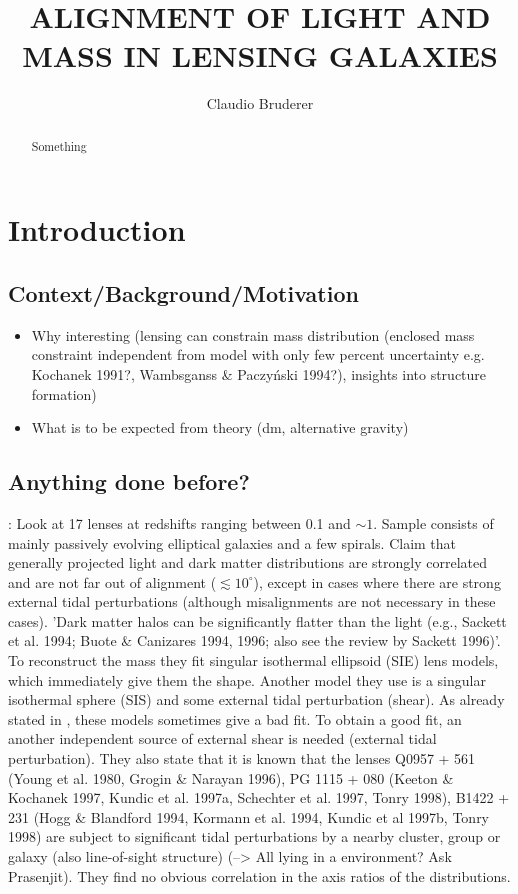 \documentclass[10pt]{article}
\title{ALIGNMENT OF LIGHT AND MASS IN LENSING GALAXIES}
\author{Claudio Bruderer}
\begin{document}
\maketitle


\begin{abstract}
\noindent Something
\end{abstract}





\section{Introduction}

\subsection{Context/Background/Motivation}
\begin{itemize}
\item Why interesting (lensing can constrain mass distribution (enclosed mass constraint independent from model with only few percent uncertainty e.g. Kochanek 1991?, Wambsganss \& Paczyński 1994?), insights into structure formation)
\item What is to be expected from theory (dm, alternative gravity)
\end{itemize}


\subsection{Anything done before?}
\textbf{\cite{1997ApJ...482..604K}}: Look at 17 lenses at redshifts ranging between 0.1 and $\sim1$. Sample consists of mainly passively evolving elliptical galaxies and a few spirals. Claim that generally projected light and dark matter distributions are strongly correlated and are not far out of alignment ($\lesssim10^{\circ}$), except in cases where there are strong external tidal perturbations (although misalignments are not necessary in these cases). 'Dark matter halos can be significantly flatter than the light (e.g., Sackett et al. 1994; Buote \& Canizares 1994, 1996; also see the review by Sackett 1996)'. To reconstruct the mass they fit singular isothermal ellipsoid (SIE) lens models, which immediately give them the shape. Another model they use is a singular isothermal sphere (SIS) and some external tidal perturbation (shear). As already stated in \cite{1998ApJ...509..561K}, these models sometimes give a bad fit. To obtain a good fit, an another independent source of external shear is needed (external tidal perturbation). They also state that it is known that the lenses Q0957 + 561 (Young et al. 1980, Grogin \& Narayan 1996), PG 1115 + 080 (Keeton \& Kochanek 1997, Kundic et al. 1997a, Schechter et al. 1997, Tonry 1998), B1422 + 231 (Hogg \& Blandford 1994, Kormann et al. 1994, Kundic et al 1997b, Tonry 1998) are subject to significant tidal perturbations by a nearby cluster, group or galaxy (also line-of-sight structure) (--> All lying in a environment? Ask Prasenjit). They find no obvious correlation in the axis ratios of the distributions.
\end{document}
